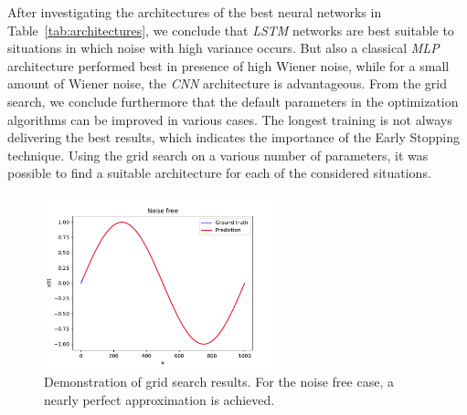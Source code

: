 \documentclass{article}
\begin{document}
After 
investigating the architectures of the best neural networks in 
Table~\ref{tab:architectures}, we conclude that \emph{LSTM} networks are best 
suitable to situations in which noise with high variance occurs. But also a 
classical \emph{MLP} architecture performed best in presence of high Wiener
noise, while for a small amount
of Wiener noise, the \emph{CNN} architecture is advantageous. From the 
grid search, we conclude furthermore that the default parameters in the 
optimization algorithms can be improved in various cases. The longest training
is not always delivering the best results, which indicates the importance of 
the Early Stopping technique. Using the grid search on a various number of
parameters, it was possible to find a suitable architecture for each of the
considered situations.

\begin{figure}
    \centering
    \includegraphics[width=0.6\textwidth]{figures/Noise_free.pdf}
    \caption{Demonstration of grid search results. For the noise free case,
    a nearly perfect approximation is achieved.}
    \label{fig:sinenoisefree}
\end{figure}
\end{document}
